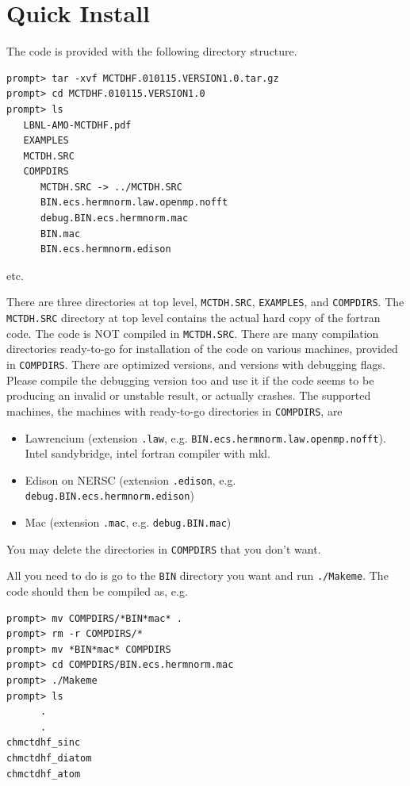 \documentclass[10pt,leqno, oneside]{book}
\begin{document}
\section{Quick Install}

The code is provided with the following directory structure.  
%
{\footnotesize
\begin{verbatim}
prompt> tar -xvf MCTDHF.010115.VERSION1.0.tar.gz
prompt> cd MCTDHF.010115.VERSION1.0
prompt> ls
   LBNL-AMO-MCTDHF.pdf
   EXAMPLES
   MCTDH.SRC
   COMPDIRS
      MCTDH.SRC -> ../MCTDH.SRC
      BIN.ecs.hermnorm.law.openmp.nofft
      debug.BIN.ecs.hermnorm.mac
      BIN.mac
      BIN.ecs.hermnorm.edison
\end{verbatim}}
%
etc.

There are three directories at top level, \verb#MCTDH.SRC#, \verb#EXAMPLES#, and \verb#COMPDIRS#.  
The \verb#MCTDH.SRC# directory at top level contains the actual hard copy of the fortran code.  The code is NOT compiled in \verb#MCTDH.SRC#.
There are many compilation directories ready-to-go for installation of the code on various machines, provided in \verb#COMPDIRS#.  
There are optimized versions, and versions with debugging flags.  Please compile the debugging version too and use it if the code
seems to be producing an invalid or unstable result, or actually crashes.  The supported machines, the machines with ready-to-go
directories in \verb#COMPDIRS#, are 
\begin{itemize}
\item{Lawrencium (extension \verb#.law#, e.g. \verb#BIN.ecs.hermnorm.law.openmp.nofft#).  Intel sandybridge, intel fortran compiler with mkl.}
\item{Edison on NERSC (extension \verb#.edison#, e.g. \verb#debug.BIN.ecs.hermnorm.edison#)}
\item{Mac (extension \verb#.mac#, e.g. \verb#debug.BIN.mac#)}
\end{itemize}

You may delete the directories in \verb#COMPDIRS# that you don't want.

All you need to do is go to the \verb#BIN# directory you want and run \verb#./Makeme#.  The code should then be compiled as, e.g.
{\footnotesize
\begin{verbatim}
prompt> mv COMPDIRS/*BIN*mac* .
prompt> rm -r COMPDIRS/*
prompt> mv *BIN*mac* COMPDIRS
prompt> cd COMPDIRS/BIN.ecs.hermnorm.mac
prompt> ./Makeme
prompt> ls
      .
      .
chmctdhf_sinc
chmctdhf_diatom
chmctdhf_atom
\end{verbatim}}
\end{document}
